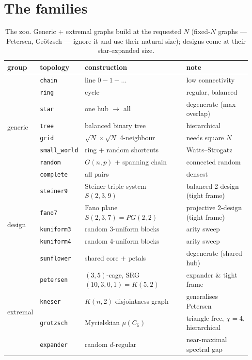 \documentclass[11pt]{article}
\begin{document}
\section{The families}
\begin{table}[h]\centering\small
\begin{tabular}{llll}
\toprule
group & topology & construction & note \\
\midrule
\multirow{8}{*}{generic}
 & \texttt{chain} & line $0\!-\!1\!-\!\dots$ & low connectivity \\
 & \texttt{ring} & cycle & regular, balanced \\
 & \texttt{star} & one hub $\to$ all & degenerate (max overlap) \\
 & \texttt{tree} & balanced binary tree & hierarchical \\
 & \texttt{grid} & $\sqrt N\times\sqrt N$ 4-neighbour & needs square $N$ \\
 & \texttt{small\_world} & ring $+$ random shortcuts & Watts--Strogatz \\
 & \texttt{random} & $G(n,p)$ $+$ spanning chain & connected random \\
 & \texttt{complete} & all pairs & densest \\
\midrule
\multirow{5}{*}{design}
 & \texttt{steiner9} & Steiner triple system $S(2,3,9)$ & balanced 2-design (tight frame) \\
 & \texttt{fano7} & Fano plane $S(2,3,7)=PG(2,2)$ & projective 2-design (tight frame) \\
 & \texttt{kuniform3} & random 3-uniform blocks & arity sweep \\
 & \texttt{kuniform4} & random 4-uniform blocks & arity sweep \\
 & \texttt{sunflower} & shared core $+$ petals & degenerate (shared hub) \\
\midrule
\multirow{4}{*}{extremal}
 & \texttt{petersen} & $(3,5)$-cage, SRG$(10,3,0,1)=K(5,2)$ & expander \& tight frame \\
 & \texttt{kneser} & $K(n,2)$ disjointness graph & generalises Petersen \\
 & \texttt{grotzsch} & Mycielskian $\mu(C_5)$ & triangle-free, $\chi{=}4$, hierarchical \\
 & \texttt{expander} & random $d$-regular & near-maximal spectral gap \\
\bottomrule
\end{tabular}
\caption{The zoo. Generic + extremal graphs build at the requested $N$ (fixed-$N$ graphs --- Petersen, Grötzsch ---
ignore it and use their natural size); designs come at their star-expanded size.}
\end{table}
\end{document}
